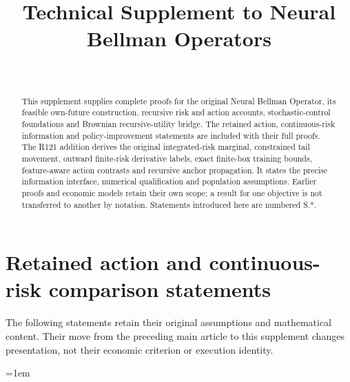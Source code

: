 \documentclass[ecta,nameyear,draft]{econsocart}
\begin{document}
\begin{frontmatter}
\title{Technical Supplement to Neural Bellman Operators}
\begin{aug}
\author[id=au1,addressref={add1}]{~}
\address[id=add1]{Peking University}
\end{aug}
\begin{abstract}This supplement supplies complete proofs for the original Neural Bellman Operator, its feasible own-future construction, recursive risk and action accounts, stochastic-control foundations and Brownian recursive-utility bridge. The retained action, continuous-risk information and policy-improvement statements are included with their full proofs. The R121 addition derives the original integrated-risk marginal, constrained tail movement, outward finite-risk derivative labels, exact finite-box training bounds, feature-aware action contrasts and recursive anchor propagation. It states the precise information interface, numerical qualification and population assumptions. Earlier proofs and economic models retain their own scope; a result for one objective is not transferred to another by notation. Statements introduced here are numbered S.*. \end{abstract}
\end{frontmatter}
\section{Retained action and continuous-risk comparison statements}
The following statements retain their original assumptions and mathematical
content. Their move from the preceding main article to this supplement changes
presentation, not their economic criterion or execution identity.
























\begingroup\emergencystretch=1em

\endgroup
\end{document}
